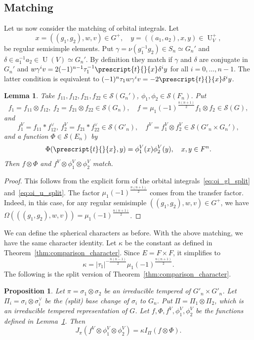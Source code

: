 \documentclass[letterpaper,11pt]{amsart}
\newcommand{\cS}{\mathcal{S}}
\newcommand{\<}{\negthickspace}
\newcommand{\tp}[1]{\prescript{t}{}{#1}}
\providecommand{\abs}[1]{\lvert#1\rvert}
\DeclareMathOperator{\U}{U}
\theoremstyle{definition}
\theoremstyle{plain}
\newtheorem{prop}[definition]{Proposition}
\newtheorem{lemma}[definition]{Lemma}
\theoremstyle{remark}
\numberwithin{equation}{section}
\begin{document}
\subsection{Matching}   \label{subsec:matching_split}
Let us now consider the matching of orbital integrals. Let
    \[
    x = ((g_1, g_2), w, v) \in G^+, \quad
    y = ((a_1, a_2), x, y) \in \U_V^+,
    \]
be regular semisimple elements. Put $\gamma = \nu(g_1^{-1} g_2) \in S_n
\simeq G_n'$ and $\delta \in a_1^{-1} a_2 \in \U(V) \simeq G_n'$. By
definition they match if $\gamma$ and $\delta$ are conjugate in $G_n'$ and $w
\gamma^i v = 2 (-1)^{n-1} \tau_1^{-1} \tp{x} \delta^{i} y$
for all $i = 0, \hdots, n-1$. The latter condition is equivalent to
$(-1)^n \tau_1 w \gamma^i v = -2 \tp{x} \delta^{i} y$.

\begin{lemma}   \label{lemma:matching_split}
Take $f_{11}, f_{12}, f_{21}, f_{22} \in \cS(G_n')$, $\phi_1, \phi_2 \in
\cS(F_{n})$. Put
    \[
    f_1 = f_{11} \otimes f_{12},\ f_2 = f_{21} \otimes f_{22} \in \cS(G_n), \quad
    f = \mu_1(-1)^{\frac{n(n+1)}{2}} f_1 \otimes f_2 \in \cS(G),
    \]
and
    \[
    f_1^V = f_{11} * f_{12}^\vee,\ f_2^V = f_{21} * f_{22}^\vee \in \cS(G'_n),
    \quad
    f^V = f_1^V \otimes f_2^V \in \cS(G'_n \times G_n'),
    \]
and a function $\Phi \in \cS(E_n)$ by
    \[
    \Phi(\tp{x}, y) = \phi_1^V (x) \phi_2^V(y),
    \quad x, y \in F^n.
    \]
Then $f \otimes \Phi$ and $f^V \otimes \phi_1^V \otimes \phi_2^V$ match.
\end{lemma}

\begin{proof}
This follows from the explicit form of the orbital
integrals~\eqref{eq:oi_gl_split} and~\eqref{eq:oi_u_split}. The factor
$\mu_1(-1)^{\frac{n(n+1)}{2}}$ comes from the transfer factor. Indeed, in
this case, for any regular semisimple $((g_1, g_2), w, v) \in G^+$, we have
$\Omega(((g_1, g_2), w, v)) = \mu_1(-1)^{\frac{n(n+1)}{2}}$.
\end{proof}


We can define the spherical characters as before. With the above matching, we
have the same character identity. Let $\kappa$ be the constant as defined in
Theorem~\ref{thm:comparison_character}. Since $E = F \times F$, it simplifies
to
    \[
    \kappa = \abs{\tau_1}^{-\frac{n(n-1)}{2}} \mu_1(-1)^{\frac{n(n+1)}{2}}.
    \]
The following is the split version of Theorem~\ref{thm:comparison_character}.

\begin{prop}    \label{prop:comparison_character_split}
Let $\pi = \sigma_1 \otimes \sigma_2$ be an irreducible tempered of $G'_n
\times G'_n$. Let $\Pi_i = \sigma_i \otimes \sigma_i^\vee$ be the (split)
base change of $\sigma_i$ to $G_n$. Put $\Pi = \Pi_1 \otimes \Pi_2$, which is
an irreducible tempered representation of $G$. Let $f, \Phi, f^V, \phi_1^V,
\phi_2^V$ be the functions defined in Lemma~\ref{lemma:matching_split}. Then
    \[
    J_{\pi}(f^V \otimes \phi_1^V \otimes \phi_2^V) = \kappa
    I_{\Pi}(f \otimes \Phi).
    \]
\end{prop}
\end{document}
